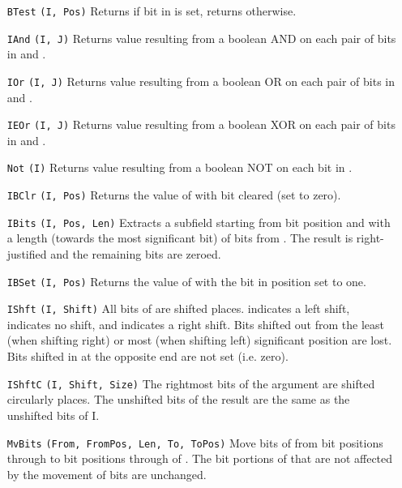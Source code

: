 \begin{itemize}
  \item[\tt BTest]{\tt (I, Pos)}
    Returns  if bit  in  is set,
    returns  otherwise.
  \item[\tt IAnd]{\tt (I, J)}
    Returns value resulting from a boolean AND on each pair of bits
    in  and .
  \item[\tt IOr]{\tt (I, J)}
    Returns value resulting from a boolean OR on each pair of bits
    in  and .
  \item[\tt IEOr]{\tt (I, J)}
    Returns value resulting from a boolean XOR on each pair of bits
    in  and .
  \item[\tt Not]{\tt (I)}
    Returns value resulting from a boolean NOT on each bit in .
  \item[\tt IBClr]{\tt (I, Pos)}
    Returns the value of  with bit  cleared (set to zero).
  \item[\tt IBits]{\tt (I, Pos, Len)}
    Extracts a subfield starting from bit position  and with a
    length (towards the most significant bit) of  bits from .
    The result is right-justified and the remaining bits are zeroed.
  \item[\tt IBSet]{\tt (I, Pos)}
    Returns the value of  with the bit in position  set to one.
  \item[\tt IShft]{\tt (I, Shift)}
    All bits of  are shifted  places.
     indicates a left shift,
     indicates no shift, and
     indicates a right shift.
    Bits shifted out from the least (when shifting right) or
    most (when shifting left) significant position are lost.
    Bits shifted in at the opposite end are not set (i.e. zero).
  \item[\tt IShftC]{\tt (I, Shift, Size)}
    The rightmost  bits of the argument  are shifted
    circularly  places.
    The unshifted bits of the result are the same as the unshifted bits of I.
  \item[\tt MvBits]{\tt (From, FromPos, Len, To, ToPos)}
    Move  bits of  from bit positions 
    through  to bit positions  through
     of . The bit portions of  that
    are not affected by the movement of bits are unchanged.
\end{itemize}

